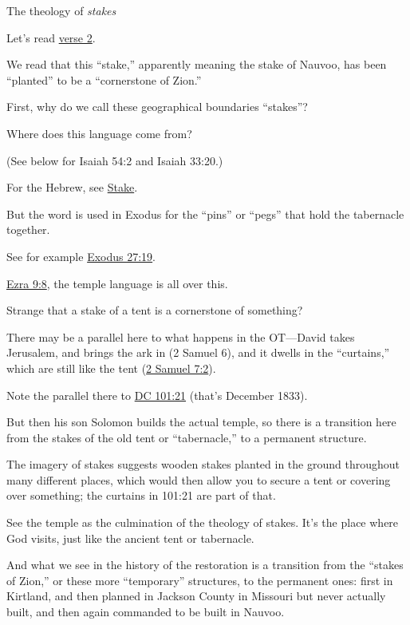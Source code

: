 \begin{compactitem}
			\item The theology of \textit{stakes}
				\begin{compactitem}
					\item Let's read \hyperref[DC124-2]{verse 2}.
						\begin{compactitem}
							\item We read that this ``stake,'' apparently meaning the stake of Nauvoo, has been ``planted'' to be a ``cornerstone of Zion.'' 
						\end{compactitem}
					\item First, why do we call these geographical boundaries ``stakes''?
					\item Where does this language come from?
						\begin{compactitem}
							\item (See below for Isaiah 54:2 and Isaiah 33:20.)
							\item For the Hebrew, see \hyperref[STAKE]{Stake}.
							\item But the word is used in Exodus for the ``pins'' or ``pegs'' that hold the tabernacle together.
							\item See for example \hyperref[EXODUS-27-19]{Exodus 27:19}.
							\item \hyperref[EZRA-9-8]{Ezra 9:8}, the temple language is all over this.
						\end{compactitem}
					\item Strange that a stake of a tent is a cornerstone of something?
					\item There may be a parallel here to what happens in the OT---David takes Jerusalem, and brings the ark in (2 Samuel 6), and it dwells in the ``curtains,'' which are still like the tent (\hyperref[2SAMUEL-7-2]{2 Samuel 7:2}).
					\item Note the parallel there to \hyperref[DC101-21]{DC 101:21} (that's December 1833).
					\item But then his son Solomon builds the actual temple, so there is a transition here from the stakes of the old tent or ``tabernacle,'' to a permanent structure.
					\item The imagery of stakes suggests wooden stakes planted in the ground throughout many different places, which would then allow you to secure a tent or covering over something; the curtains in 101:21 are part of that.
					\item See the temple as the culmination of the theology of stakes. It's the place where God visits, just like the ancient tent or tabernacle.
					\item And what we see in the history of the restoration is a transition from the ``stakes of Zion,'' or these more ``temporary'' structures, to the permanent ones: first in Kirtland, and then planned in Jackson County in Missouri but never actually built, and then again commanded to be built in Nauvoo.
				\end{compactitem}
				

\end{compactitem}
